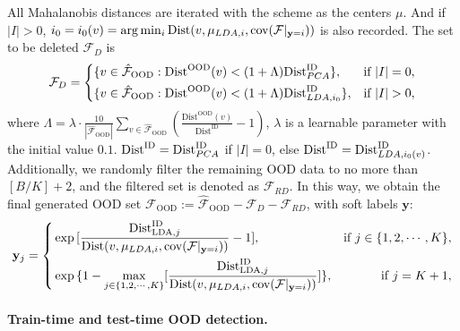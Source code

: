 \documentclass{article}
\theoremstyle{plain}
\theoremstyle{definition}
\theoremstyle{remark}
\begin{document}
All Mahalanobis distances are iterated with the scheme as the centers $\mu$. And if $|I|>0$, $i_0=i_0(v) = \arg\min_{i}\text{Dist}(v, \mu_{{\rm LDA},i}, \text{cov}(\mathcal{F}|_{\mathbf{y}=i}))$ is also recorded. The set to be deleted $\mathcal{F}_D$ is 
\begin{equation}
    \mathcal{F}_D = 
    \left\{
        \begin{aligned}
        &\{v\in \hat{\mathcal{F}}_{\text{OOD}}: \text{Dist}^{\text{OOD}}(v)<(1+\Lambda)\text{Dist}^{\text{ID}}_{{\rm PCA}}\}, &\text{if}~ |I|=0,\\
        &\{v\in \hat{\mathcal{F}}_{\text{OOD}}: \text{Dist}^{\text{OOD}}(v)<(1+\Lambda)\text{Dist}^{\text{ID}}_{{\rm LDA}, i_0}\}, &\text{if}~ |I|>0,
        \end{aligned}
        \right.
        \label{eq: 32-1}
\end{equation}
where $\Lambda = \lambda \cdot \frac{10}{|\hat{\mathcal{F}}_{\text{OOD}}|}\sum_{v \in \hat{\mathcal{F}}_{\text{OOD}}}(\frac{\text{Dist}^{\text{OOD}}(v)}{\text{Dist}^{\text{ID}}}-1)$, $\lambda$ is a learnable parameter with the initial value $0.1$. $\text{Dist}^{\text{ID}}=\text{Dist}^{\text{ID}}_{{\rm PCA}}$ if $|I|=0$, else  $\text{Dist}^{\text{ID}}=\text{Dist}^{\text{ID}}_{{\rm LDA},i_0(v)}$.
%
Additionally, we randomly filter the remaining OOD data to no more than $[B/K]+2$, and the filtered set is denoted as $\mathcal{F}_{RD}$.
%
In this way, we obtain the final generated OOD set $\mathcal{F}_{\text{OOD}}:= \hat{\mathcal{F}}_{\text{OOD}} - \mathcal{F}_D - \mathcal{F}_{RD}$, with soft labels $\mathbf{y}$:
\begin{equation}
    \mathbf{y}_j = \left\{
        \begin{aligned}
        &\exp{[\frac{\text{Dist}^{\text{ID}}_{\text{LDA},j}}{\text{Dist}(v, \mu_{{\rm LDA},i}, \text{cov}(\mathcal{F}|_{\mathbf{y}=i}))}-1]}, &\text{if}~ j \in \{1,2,\cdots,K\},\\
        &\exp{\{1-\max_{j \in \{1,2,\cdots,K\}}[\frac{\text{Dist}^{\text{ID}}_{\text{LDA},j}}{\text{Dist}(v, \mu_{{\rm LDA},i}, \text{cov}(\mathcal{F}|_{\mathbf{y}=i}))}]\}}, &\text{if}~ j=K+1,
        \end{aligned}
        \right.
        \label{eq: soft}
\end{equation}

\paragraph{Train-time and test-time OOD detection.}
\end{document}
